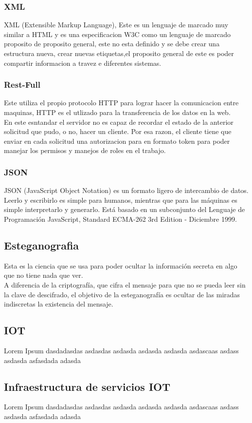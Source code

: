 \subsubsection{XML}
XML (Extensible Markup Language), Este es un lenguaje de marcado muy similar a HTML y es una especificacion  W3C como un lenguaje de marcado  proposito de proposito general, este no esta definido y se debe crear una estructura nueva, crear nuevas etiquetas,el proposito general de este es poder compartir informacion a travez e diferentes sistemas.
\subsubsection{Rest-Full}
Este utiliza el propio protocolo HTTP para lograr hacer la comunicacion entre maquinas, HTTP es el utlizado para la transferencia de los datos en la web.\\
En este esntandar el servidor no es capaz de recordar el estado de la anterior solicitud que pudo, o no, hacer un cliente. Por esa razon, el cliente tiene que enviar en cada solicitud una autorizacion para en formato token para poder manejar los permisos y manejos de roles en el trabajo.
\subsubsection{JSON}
JSON (JavaScript Object Notation) es un formato ligero de intercambio de datos. Leerlo y escribirlo es simple para humanos, mientras que para las máquinas es simple interpretarlo y generarlo. Está basado en un subconjunto del Lenguaje de Programación JavaScript, Standard ECMA-262 3rd Edition - Diciembre 1999.
\subsection{Esteganografia}
Esta es la ciencia que se usa para poder ocultar la información secreta en algo que no tiene nada que ver.\\
 A diferencia de la criptografía, que cifra el mensaje para que no se pueda leer sin la clave de descifrado, el objetivo de la esteganografía es ocultar de las miradas indiscretas la existencia del mensaje.
\subsection{IOT}
Lorem Ipsum dasdadasdas asdasdas asdasda asdasda asdasda asdascaas asdass asdasda asfasdada adasda
\subsection{Infraestructura de servicios IOT}
Lorem Ipsum dasdadasdas asdasdas asdasda asdasda asdasda asdascaas asdass asdasda asfasdada adasda
